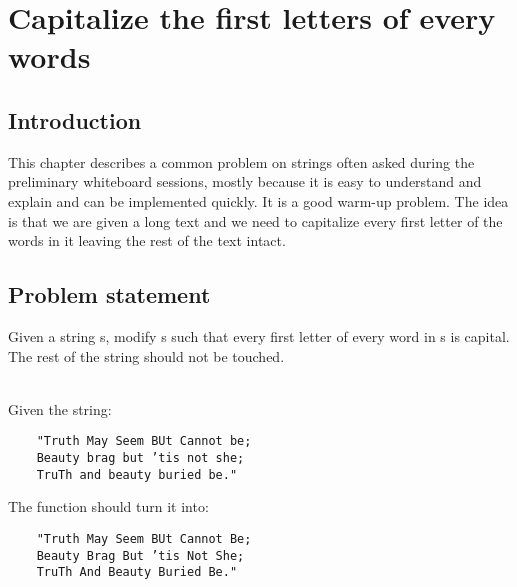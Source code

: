 %

\chapter{Capitalize the first letters of every words}
\label{ch:capitalize_words_first_letter}
\section*{Introduction}
This chapter describes a common problem on strings often asked during the preliminary whiteboard sessions, mostly because it is easy to understand and explain and can be implemented quickly. It is a good warm-up problem.
The idea is that we are given a long text and we need to capitalize every first letter of the words in it leaving the rest of the text intact.

\section{Problem statement}
\begin{exercise}
Given a string s, modify s such that every first letter of every word in s is capital. The rest of the string should not be touched.

\end{exercise}


\begin{example}
	\hfill \\
	Given the string:
	\begin{verbatim}
	"Truth May Seem BUt Cannot be;
	Beauty brag but ’tis not she;
	TruTh and beauty buried be."
	\end{verbatim}
	The function should turn it into: 
	\begin{verbatim}
	"Truth May Seem BUt Cannot Be;
	Beauty Brag But ’tis Not She;
	TruTh And Beauty Buried Be."
	\end{verbatim}
\end{example}



